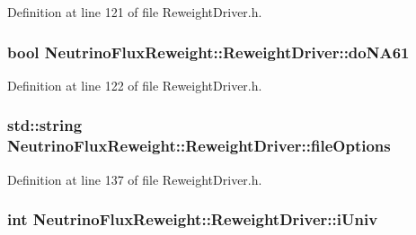Definition at line 121 of file Reweight\-Driver.\-h.

\hypertarget{class_neutrino_flux_reweight_1_1_reweight_driver_a2bf534e3c1edd88075c4cf720390e2df}{
\subsubsection[{do\-N\-A61}]{\setlength{\rightskip}{0pt plus 5cm}bool Neutrino\-Flux\-Reweight\-::\-Reweight\-Driver\-::do\-N\-A61}}\label{class_neutrino_flux_reweight_1_1_reweight_driver_a2bf534e3c1edd88075c4cf720390e2df}


Definition at line 122 of file Reweight\-Driver.\-h.

\hypertarget{class_neutrino_flux_reweight_1_1_reweight_driver_a5c94865c09d7fd5441ef12c1ec7792f4}{
\subsubsection[{file\-Options}]{\setlength{\rightskip}{0pt plus 5cm}std\-::string Neutrino\-Flux\-Reweight\-::\-Reweight\-Driver\-::file\-Options\hspace{0.3cm}{\ttfamily [private]}}}\label{class_neutrino_flux_reweight_1_1_reweight_driver_a5c94865c09d7fd5441ef12c1ec7792f4}


Definition at line 137 of file Reweight\-Driver.\-h.

\hypertarget{class_neutrino_flux_reweight_1_1_reweight_driver_a916073e9a6658dd7cbc7c8819dd71c8a}{
\subsubsection[{i\-Univ}]{\setlength{\rightskip}{0pt plus 5cm}int Neutrino\-Flux\-Reweight\-::\-Reweight\-Driver\-::i\-Univ\hspace{0.3cm}{\ttfamily [private]}}}\label{class_neutrino_flux_reweight_1_1_reweight_driver_a916073e9a6658dd7cbc7c8819dd71c8a}


